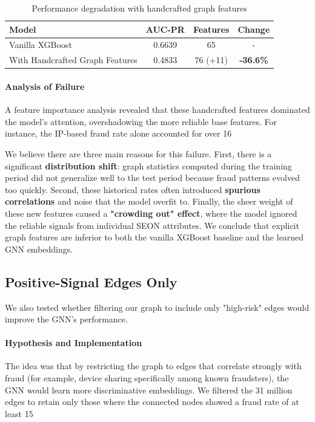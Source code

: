 \begin{table}[h]
\centering
\caption{Performance degradation with handcrafted graph features}
\label{tab:handcrafted_results}
\begin{tabular}{lccc}
\hline
\textbf{Model} & \textbf{AUC-PR} & \textbf{Features} & \textbf{Change} \\
\hline
Vanilla XGBoost & 0.6639 & 65 & - \\
With Handcrafted Graph Features & 0.4833 & 76 (+11) & \textbf{-36.6\%} \\
\hline
\end{tabular}
\end{table}

\paragraph{Analysis of Failure}
A feature importance analysis revealed that these handcrafted features dominated the model's attention, overshadowing the more reliable base features. For instance, the IP-based fraud rate alone accounted for over 16%

We believe there are three main reasons for this failure. First, there is a significant \textbf{distribution shift}: graph statistics computed during the training period did not generalize well to the test period because fraud patterns evolved too quickly. Second, these historical rates often introduced \textbf{spurious correlations} and noise that the model overfit to. Finally, the sheer weight of these new features caused a \textbf{"crowding out" effect}, where the model ignored the reliable signals from individual SEON attributes. We conclude that explicit graph features are inferior to both the vanilla XGBoost baseline and the learned GNN embeddings.

\subsection{Positive-Signal Edges Only}

We also tested whether filtering our graph to include only "high-risk" edges would improve the GNN's performance.

\paragraph{Hypothesis and Implementation}
The idea was that by restricting the graph to edges that correlate strongly with fraud (for example, device sharing specifically among known fraudsters), the GNN would learn more discriminative embeddings. We filtered the 31 million edges to retain only those where the connected nodes showed a fraud rate of at least 15%


